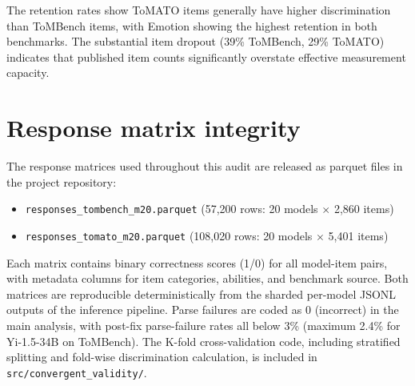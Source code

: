\documentclass{article} %
\begin{document}
The retention rates show ToMATO items generally have higher discrimination than ToMBench items, with Emotion showing the highest retention in both benchmarks. The substantial item dropout (39\% ToMBench, 29\% ToMATO) indicates that published item counts significantly overstate effective measurement capacity.

\section{Response matrix integrity}
\label{app:integrity}

The response matrices used throughout this audit are released as parquet files in the project repository:
\begin{itemize}
\item \texttt{responses\_tombench\_m20.parquet} (57{,}200 rows: 20 models $\times$ 2{,}860 items)
\item \texttt{responses\_tomato\_m20.parquet} (108{,}020 rows: 20 models $\times$ 5{,}401 items)
\end{itemize}

Each matrix contains binary correctness scores (1/0) for all model-item pairs, with metadata columns for item categories, abilities, and benchmark source. Both matrices are reproducible deterministically from the sharded per-model JSONL outputs of the inference pipeline. Parse failures are coded as 0 (incorrect) in the main analysis, with post-fix parse-failure rates all below 3\% (maximum 2.4\% for Yi-1.5-34B on ToMBench). The K-fold cross-validation code, including stratified splitting and fold-wise discrimination calculation, is included in \texttt{src/convergent\_validity/}. 
\end{document}
